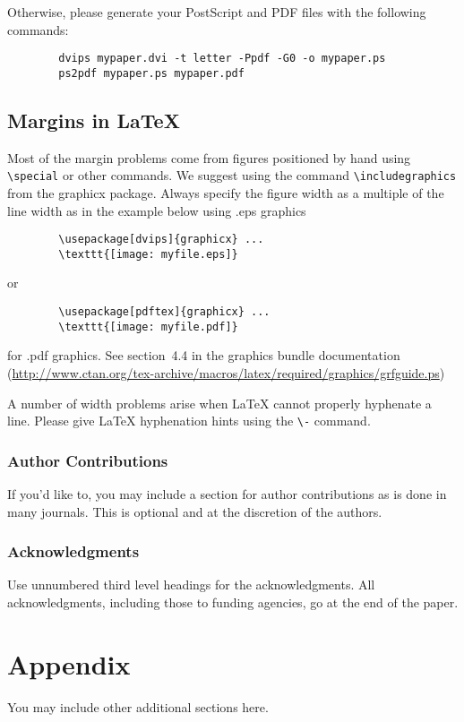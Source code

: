 \documentclass{article} %
\begin{document}
	Otherwise, please generate your PostScript and PDF files with the following commands:
	\begin{verbatim}
		dvips mypaper.dvi -t letter -Ppdf -G0 -o mypaper.ps
		ps2pdf mypaper.ps mypaper.pdf
	\end{verbatim}
	
	\subsection{Margins in LaTeX}
	
	Most of the margin problems come from figures positioned by hand using
	\verb+\special+ or other commands. We suggest using the command
	\verb+\includegraphics+
	from the graphicx package. Always specify the figure width as a multiple of
	the line width as in the example below using .eps graphics
	\begin{verbatim}
		\usepackage[dvips]{graphicx} ...
		\texttt{[image: myfile.eps]}
	\end{verbatim}
	or %
	\begin{verbatim}
		\usepackage[pdftex]{graphicx} ...
		\texttt{[image: myfile.pdf]}
	\end{verbatim}
	for .pdf graphics.
	See section~4.4 in the graphics bundle documentation (\url{http://www.ctan.org/tex-archive/macros/latex/required/graphics/grfguide.ps})
	
	A number of width problems arise when LaTeX cannot properly hyphenate a
	line. Please give LaTeX hyphenation hints using the \verb+\-+ command.
	
	\subsubsection*{Author Contributions}
	If you'd like to, you may include  a section for author contributions as is done
	in many journals. This is optional and at the discretion of the authors.
	
	\subsubsection*{Acknowledgments}
	Use unnumbered third level headings for the acknowledgments. All
	acknowledgments, including those to funding agencies, go at the end of the paper.
	
	
	
	
	
	\appendix
	\section{Appendix}
	You may include other additional sections here.
	
	
\end{document}
